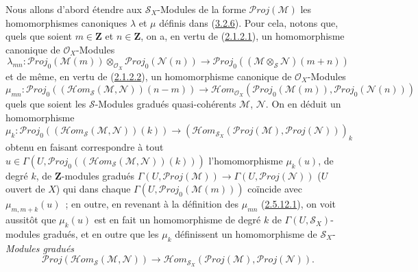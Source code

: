 \begin{env}[8.14.2]
\label{II.8.14.2-fr}
Nous allons d'abord étendre aux $\mathcal{S}_X$-Modules de la forme
$\mathcal{P}\mathit{roj}(\mathcal{M})$ les homomorphismes canoniques $\lambda$
et $\mu$ définis dans (\hyperref[II.3.2.6-fr]{3.2.6}). Pour cela, notons
que, quels que soient $m\in\mathbf{Z}$ et $n\in\mathbf{Z}$, on a, en vertu
de (\hyperref[II.2.1.2.1-fr]{2.1.2.1}), un homomorphisme canonique de
$\mathcal{O}_X$-Modules
\begin{equation}
\label{II.8.14.2.1-fr}
  \lambda_{mn}:\mathcal{P}\mathit{roj}_0(\mathcal{M}(m))
  \otimes_{\mathcal{O}_X}\mathcal{P}\mathit{roj}_0(\mathcal{N}(n))
  \to\mathcal{P}\mathit{roj}_0
  ((\mathcal{M}\otimes_{\mathcal{S}}\mathcal{N})(m+n))
\tag{8.14.2.1}
\end{equation}
et de même, en vertu de (\hyperref[II.2.1.2.2-fr]{2.1.2.2}), un
homomorphisme canonique de $\mathcal{O}_X$-Modules
\begin{equation}
\label{II.8.14.2.2-fr}
  \mu_{mn}:\mathcal{P}\mathit{roj}_0
  ((\mathcal{H}om_{\mathcal{S}}(\mathcal{M},\mathcal{N}))(n-m))
  \to\mathcal{H}om_{\mathcal{O}_X}
  (\mathcal{P}\mathit{roj}_0(\mathcal{M}(m)),
   \mathcal{P}\mathit{roj}_0(\mathcal{N}(n)))
\tag{8.14.2.2}
\end{equation}
quels que soient les $\mathcal{S}$-Modules gradués quasi-cohérents
$\mathcal{M}$, $\mathcal{N}$. On en déduit un homomorphisme
\[
  \mu_k:\mathcal{P}\mathit{roj}_0
  ((\mathcal{H}om_{\mathcal{S}}(\mathcal{M},\mathcal{N}))(k))
  \to
  (\mathcal{H}om_{\mathcal{S}_X}
  (\mathcal{P}\mathit{roj}(\mathcal{M}),\mathcal{P}\mathit{roj}(\mathcal{N})))_k
\]
obtenu en faisant correspondre à tout
$u\in\Gamma(U,\mathcal{P}\mathit{roj}_0
((\mathcal{H}om_{\mathcal{S}}(\mathcal{M},\mathcal{N}))(k)))$
l'homomorphisme $\mu_k(u)$, de degré $k$, de $\mathbf{Z}$-modules gradués
$\Gamma(U,\mathcal{P}\mathit{roj}(\mathcal{M}))\to
\Gamma(U,\mathcal{P}\mathit{roj}(\mathcal{N}))$ ($U$ ouvert de $X$) qui dans
chaque $\Gamma(U,\mathcal{P}\mathit{roj}_0(\mathcal{M}(m)))$ coïncide avec
$\mu_{m,m+k}(u)$~; en outre, en revenant à la définition des $\mu_{mn}$
(\hyperref[II.2.5.12.1-fr]{2.5.12.1}), on voit aussitôt que $\mu_k(u)$ est
en fait un homomorphisme de degré $k$ de
$\Gamma(U,\mathcal{S}_X)$-modules gradués, et en outre que les $\mu_k$
définissent un homomorphisme de $\mathcal{S}_X$-\emph{Modules gradués}
\begin{equation}
\label{II.8.14.2.3-fr}
  \mathcal{P}\mathit{roj}
  (\mathcal{H}om_{\mathcal{S}}(\mathcal{M},\mathcal{N}))
  \to\mathcal{H}om_{\mathcal{S}_X}
  (\mathcal{P}\mathit{roj}(\mathcal{M}),\mathcal{P}\mathit{roj}(\mathcal{N})).
\tag{8.14.2.3}
\end{equation}


\end{env}
